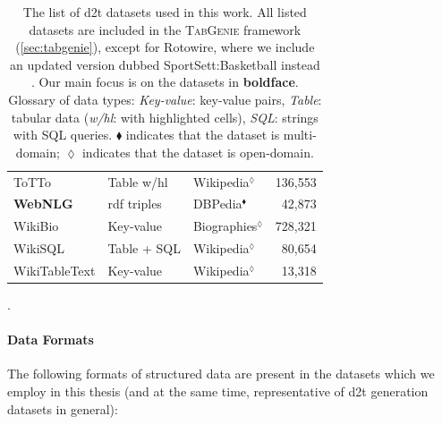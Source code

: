 {\begin{table}[t]
\begin{tabular}{@{}lllr@{}}
        ToTTo \cite{parikhToTToControlledTableToText2020}                                          & Table w/hl           & Wikipedia$^\lozenge$    & 136,553         \\
        \textbf{WebNLG} \cite{gardentWebNLGChallengeGenerating2017}                                & \acs{rdf} triples    & DBPedia$^\blacklozenge$ & 42,873          \\
        WikiBio \cite{lebretNeuralTextGeneration2016}                                              & Key-value            & Biographies$^\lozenge$  & 728,321         \\
        WikiSQL \cite{zhong2017seq2sql}                                                            & Table + SQL          & Wikipedia$^\lozenge$    & 80,654          \\
        WikiTableText \cite{bao2018table}                                                          & Key-value            & Wikipedia$^\lozenge$    & 13,318          \\
        \bottomrule
    \end{tabular}
    \caption{The list of \ac{d2t} datasets used in this work. All listed datasets are included in the \textsc{TabGenie} framework (\autoref{sec:tabgenie}), except for Rotowire, where we include an updated version dubbed SportSett:Basketball instead \cite{thomson2020sportsett}. Our main focus is on the datasets in \textbf{boldface}. Glossary of data types: \textit{Key-value}: key-value pairs, \textit{Table}: tabular data (\textit{w/hl}: with highlighted cells),  \textit{SQL}: strings with SQL queries. $\blacklozenge$ indicates that the dataset is multi-domain; $\lozenge$ indicates that the dataset is open-domain.}
    \label{tab:datasets}.
\end{table}

\paragraph{Data Formats} The following formats of structured data are present in the datasets which we employ in this thesis (and at the same time, representative of \ac{d2t} generation datasets in general):

}
